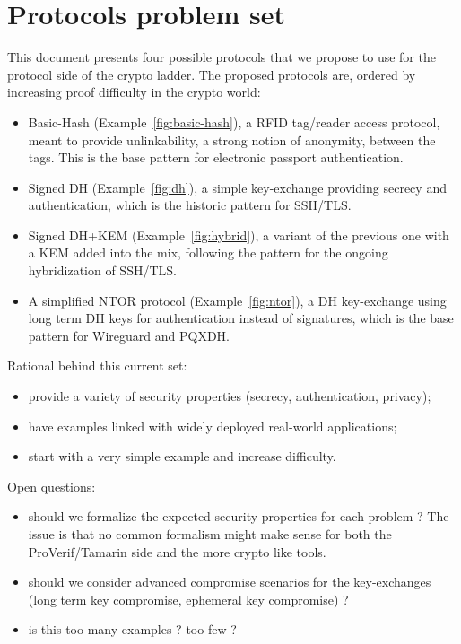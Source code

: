 \documentclass{article}
\begin{document}
\section{Protocols problem set}

This document presents four possible protocols that we propose to use for the protocol side of the crypto ladder. The proposed protocols are, ordered by increasing proof difficulty in the crypto world:
\begin{itemize}
\item Basic-Hash (Example~\ref{fig:basic-hash}), a RFID tag/reader access protocol, meant to provide unlinkability, a strong notion of anonymity, between the tags. This is the base pattern for electronic passport authentication.
\item Signed DH (Example~\ref{fig:dh}), a simple key-exchange providing secrecy and authentication,  which is the historic pattern for SSH/TLS.
\item  Signed DH+KEM (Example~\ref{fig:hybrid}), a variant of the previous one with a KEM added into the mix,  following the pattern for the ongoing hybridization of SSH/TLS.
\item A simplified NTOR protocol (Example~\ref{fig:ntor}), a DH key-exchange using long term DH keys for authentication instead of signatures, which is the base pattern for Wireguard and PQXDH.
\end{itemize}

Rational behind this current set:
\begin{itemize}
\item provide a variety of security properties (secrecy, authentication, privacy);
\item have examples linked with widely deployed real-world applications;
\item start with a very simple example and increase difficulty.  
\end{itemize}

Open questions:
\begin{itemize}
\item should we formalize the expected security properties for each problem ? The issue is that no common formalism might make sense for both the ProVerif/Tamarin side and the more crypto like tools.
\item should we consider advanced compromise scenarios for the key-exchanges (long term key compromise, ephemeral key compromise) ?  
\item is this too many examples ? too few ?  
  
\end{itemize}
\end{document}
